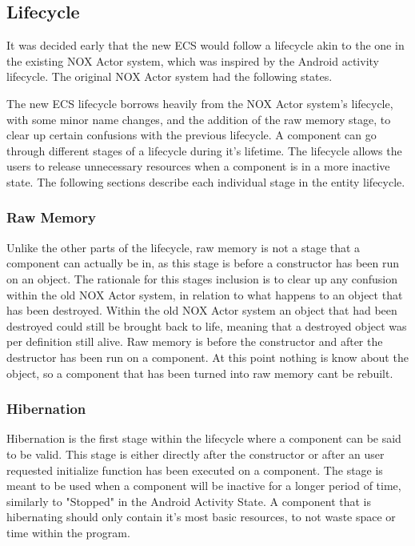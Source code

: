 \subsection{Lifecycle}
\label{subsec:high_level_lifecycle}
It was decided early that the new ECS would follow a lifecycle akin to the one in the existing NOX Actor system,
which was inspired by the Android activity lifecycle. \cite{android_activity_lifecycle} 
The original NOX Actor system had the following states.

The new ECS lifecycle borrows heavily from the NOX Actor system's lifecycle, with some minor name changes,
and the addition of the raw memory stage, to clear up certain confusions with the previous lifecycle.
A component can go through different stages of a lifecycle during it's lifetime.
The lifecycle allows the users to release unnecessary resources when a component is in a more inactive state.
The following sections describe each individual stage in the entity lifecycle.

\subsubsection{Raw Memory}
Unlike the other parts of the lifecycle, raw memory is not a stage that a component can actually be in,
as this stage is before a constructor has been run on an object.
The rationale for this stages inclusion is to clear up any confusion within the old NOX Actor system,
in relation to what happens to an object that has been destroyed.
Within the old NOX Actor system an object that had been destroyed could still be brought back to life,
meaning that a destroyed object was per definition still alive.
Raw memory is before the constructor and after the destructor has been run on a component.
At this point nothing is know about the object, so a component that has been turned into raw memory cant be rebuilt.

\subsubsection{Hibernation}
Hibernation is the first stage within the lifecycle where a component can be said to be valid.
This stage is either directly after the constructor or after an  user requested initialize function has been executed on a component.
The stage is meant to be used when a component will be inactive for a longer period of time, similarly to "Stopped" in the Android Activity State.\cite[Activity state and ejection from memory]{android_activity_lifecycle}
A component that is hibernating should only contain it's most basic resources, to not waste space or time within the program.

